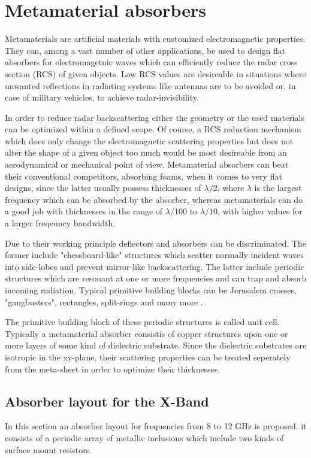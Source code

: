 \section{Metamaterial absorbers}
Metamaterials are artificial materials with customized electromagnetic properties. 
They can, among a vast number of other applications, be used to design flat absorbers for electromagetnic waves which can efficiently reduce the radar cross section (RCS) of given objects. Low RCS values are desireable in situations where unwanted reflections in radiating systems like antennas are to be avoided or, in case of military vehicles, to achieve radar-invisibility.

In order to reduce radar backscattering either the geometry or the used materials can be optimized within a defined scope. Of course, a RCS reduction mechanism which does only change the electromagnetic scattering properties but does not alter the shape of a given object too much would be most desireable from an aerodynamical or mechanical point of view. Metamaterial absorbers can beat their conventional competitors, absorbing foams, when it comes to very flat designs, since the latter usually possess thicknesses of $\lambda/2$, where $\lambda$ is the largest frequency which can be absorbed by the absorber, whereas metamaterials can do a good job with thicknesses in the range of $\lambda/100$ to $ \lambda/10$, with higher values for a larger freqeuncy bandwidth.

Due to their working principle deflectors and absorbers can be discriminated. The former include "chessboard-like" structures which scatter normally incident waves into side-lobes and prevent mirror-like backscattering. The latter include periodic structures which are resonant at one or more frequencies and can trap and absorb incoming radiation. Typical primitive building blocks can be Jerusalem crosses, "gangbusters", rectangles, split-rings and many more \cite{Munk2000}.

The primitive building block of these periodic structures is called unit cell. Typically a metamaterial absorber consistis of copper structures upon one or more layers of some kind of dielectric substrate. Since the dielectric substrates are isotropic in the xy-plane, their scattering properties can be treated seperately from the meta-sheet in order to optimize their thicknesses.

\subsection{Absorber layout for the X-Band}
In this section an absorber layout for frequencies from 8 to 12 GHz is proposed. it consists of
a periodic array of metallic inclusions which include two kinds of surface mount resistors.

